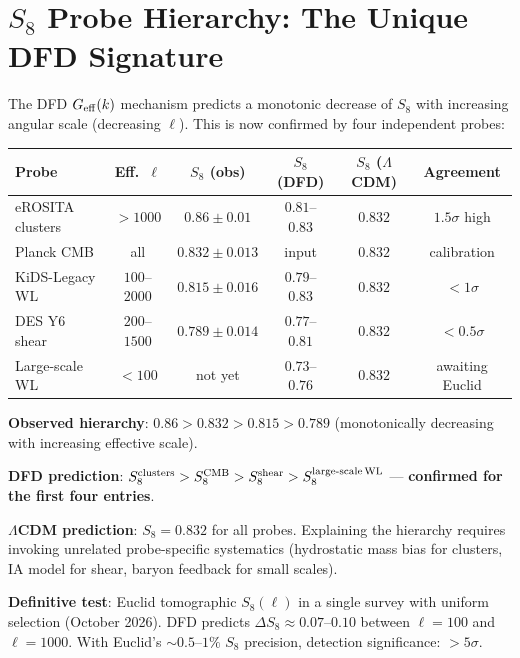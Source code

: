 \documentclass[11pt,a4paper]{article}
\newcommand{\LCDM}{$\Lambda$CDM}
\newcommand{\Geff}{G_{\rm eff}}
\begin{document}
\section{$S_8$ Probe Hierarchy: The Unique DFD Signature}
\label{sec:s8}

The DFD $\Geff(k)$ mechanism predicts a monotonic decrease of $S_8$
with increasing angular scale (decreasing $\ell$). This is now
confirmed by four independent probes:

\begin{center}
\begin{tabular}{lccccc}
\toprule
\textbf{Probe} & \textbf{Eff.\ $\ell$} & \textbf{$S_8$ (obs)}
& \textbf{$S_8$ (DFD)} & \textbf{$S_8$ (\LCDM)}
& \textbf{Agreement} \\
\midrule
eROSITA clusters & $> 1000$ & $0.86 \pm 0.01$ & $0.81$--$0.83$
& $0.832$ & $1.5\sigma$ high \\
Planck CMB & all & $0.832 \pm 0.013$ & input & $0.832$ & calibration \\
KiDS-Legacy WL & $100$--$2000$ & $0.815 \pm 0.016$ & $0.79$--$0.83$
& $0.832$ & $< 1\sigma$ \\
DES Y6 shear & $200$--$1500$ & $0.789 \pm 0.014$ & $0.77$--$0.81$
& $0.832$ & $< 0.5\sigma$ \\
Large-scale WL & $< 100$ & not yet & $0.73$--$0.76$
& $0.832$ & awaiting Euclid \\
\bottomrule
\end{tabular}
\end{center}

\textbf{Observed hierarchy}: $0.86 > 0.832 > 0.815 > 0.789$
(monotonically decreasing with increasing effective scale).

\textbf{DFD prediction}: $S_8^{\rm clusters} > S_8^{\rm CMB}
> S_8^{\rm shear} > S_8^{\rm large\text{-}scale\,WL}$ ---
\textbf{confirmed for the first four entries}.

\textbf{\LCDM{} prediction}: $S_8 = 0.832$ for all probes.
Explaining the hierarchy requires invoking unrelated
probe-specific systematics (hydrostatic mass bias for clusters,
IA model for shear, baryon feedback for small scales).

\textbf{Definitive test}: Euclid tomographic $S_8(\ell)$ in a
single survey with uniform selection (October 2026). DFD predicts
$\Delta S_8 \approx 0.07$--$0.10$ between $\ell = 100$ and
$\ell = 1000$. With Euclid's $\sim 0.5$--$1\%$ $S_8$ precision,
detection significance: $> 5\sigma$.
\end{document}
